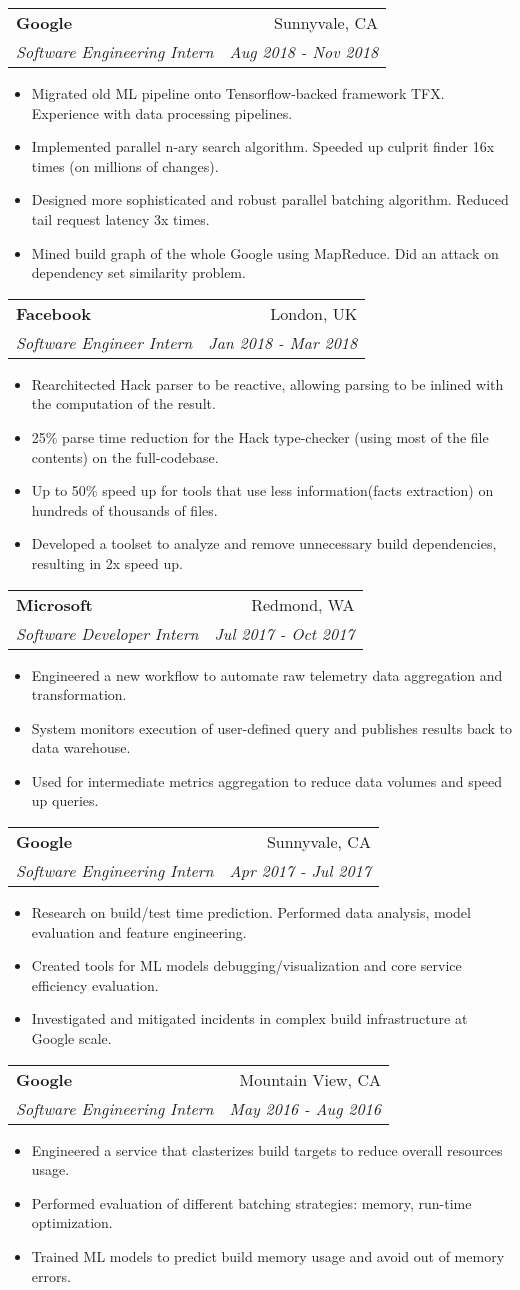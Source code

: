 \documentclass[letterpaper,11pt]{article}
\makeatletter
\newcommand{\resumeItem}[1]{
  \item\small{
    {#1 \vspace{-2pt}}
  }
}
\newcommand{\resumeSubheading}[4]{
  \vspace{-0pt}\item
    \begin{tabular*}{0.97\textwidth}{l@{\extracolsep{\fill}}r}
      \textbf{#1} & #2 \\
      \textit{\small#3} & \textit{\small #4} \\
    \end{tabular*}\vspace{-2pt}
}
\newcommand{\resumeItemListStart}{\begin{itemize}}
\newcommand{\resumeItemListEnd}{\end{itemize}\vspace{-0pt}}
\makeatother
\begin{document}
    \resumeSubheading
      {Google}{Sunnyvale, CA}
      {Software Engineering Intern}{Aug 2018 - Nov 2018}
      \resumeItemListStart
        \resumeItem{Migrated old ML pipeline onto Tensorflow-backed framework TFX. Experience with data processing pipelines.}
        \resumeItem{Implemented parallel n-ary search algorithm. Speeded up culprit finder 16x times (on millions of changes).}
        \resumeItem{Designed more sophisticated and robust parallel batching algorithm. Reduced tail request latency 3x times.}
        \resumeItem{Mined build graph of the whole Google using MapReduce. Did an attack on dependency set similarity problem.}
      \resumeItemListEnd

    \resumeSubheading
      {Facebook}{London, UK}
      {Software Engineer Intern}{Jan 2018 - Mar 2018}
      \resumeItemListStart
        \resumeItem{Rearchitected Hack parser to be reactive, allowing parsing to be inlined with the computation of the result.}
        \resumeItem{25\% parse time reduction for the Hack type-checker (using most of the file contents) on the full-codebase.}
        \resumeItem{Up to 50\% speed up for tools that use less information(facts extraction) on hundreds of thousands of files.}
        \resumeItem{Developed a toolset to analyze and remove unnecessary build dependencies, resulting in 2x speed up.}
      \resumeItemListEnd

    \resumeSubheading
      {Microsoft}{Redmond, WA}
      {Software Developer Intern}{Jul 2017 - Oct 2017}
      \resumeItemListStart
        \resumeItem{Engineered a new workflow to automate raw telemetry data aggregation and transformation.}
        \resumeItem{System monitors execution of user-defined query and publishes results back to data warehouse.}
        \resumeItem{Used for intermediate metrics aggregation to reduce data volumes and speed up queries.}
      \resumeItemListEnd

    \newpage

    \resumeSubheading
      {Google}{Sunnyvale, CA}
      {Software Engineering Intern}{Apr 2017 - Jul 2017}
      \resumeItemListStart
        \resumeItem{Research on build/test time prediction. Performed data analysis, model evaluation and feature engineering.}
        \resumeItem{Created tools for ML models debugging/visualization and core service efficiency evaluation.}
        \resumeItem{Investigated and mitigated incidents in complex build infrastructure at Google scale.}
      \resumeItemListEnd

    \resumeSubheading
      {Google}{Mountain View, CA}
      {Software Engineering Intern}{May 2016 - Aug 2016}
      \resumeItemListStart
        \resumeItem{Engineered a service that clasterizes build targets to reduce overall resources usage.}
        \resumeItem{Performed evaluation of different batching strategies: memory, run-time optimization.}
        \resumeItem{Trained ML models to predict build memory usage and avoid out of memory errors.}
      \resumeItemListEnd
\end{document}
